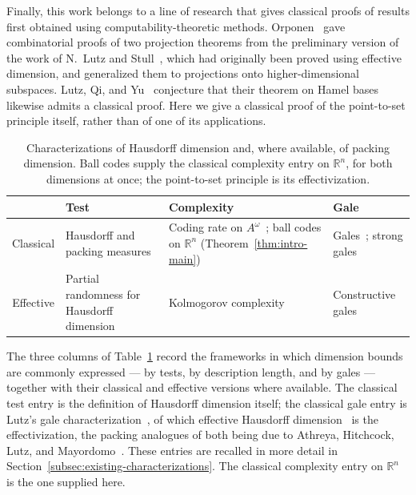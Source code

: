 \documentclass[a4paper,oneside,reqno,12pt]{amsart}
\theoremstyle{plain}
\theoremstyle{definition}
\theoremstyle{remark}
\begin{document}
Finally, this work belongs to a line of research that gives classical proofs of
results first obtained using computability-theoretic methods.
Orponen~\cite{Orponen2021} gave
combinatorial proofs of two projection theorems
from the preliminary version of the work of N.~Lutz and
Stull~\cite{LutzStull2018,LutzStull2024},
which had originally been proved using effective dimension,
and generalized them to projections onto higher-dimensional subspaces.
Lutz, Qi, and Yu~\cite{LutzQiYu2024} conjecture that
their theorem on Hamel bases likewise
admits a classical proof.
Here we give a classical proof of the point-to-set principle itself, rather than
of one of its applications.

\begin{table}[t]
\centering
\begin{tabularx}{\textwidth}{c|X|X|X}
 & Test & Complexity & Gale \\
\hline
Classical
& Hausdorff and packing measures~\cite{Falconer2014}
& Coding rate on \(A^\omega\)~\cite{Ryabko1986};
  ball codes on \(\mathbb R^n\) (Theorem~\ref{thm:intro-main})
& Gales~\cite{Lutz2003};
  strong gales~\cite{AthreyaHitchcockLutzMayordomo2007} \\
Effective
& Partial randomness for Hausdorff dimension~\cite{Tadaki2002}
& Kolmogorov complexity~\cite{Mayordomo2002,%
AthreyaHitchcockLutzMayordomo2007,LutzMayordomo2008}
& Constructive gales~\cite{Lutz2003b,%
AthreyaHitchcockLutzMayordomo2007}
\end{tabularx}
\caption{Characterizations of Hausdorff dimension and, where available, of
packing dimension.  Ball codes supply the classical complexity entry on
\(\mathbb R^n\), for both dimensions at once; the point-to-set principle is its
effectivization.}
\label{tab:test-complexity-gale}
\end{table}

The three columns of Table~\ref{tab:test-complexity-gale} record the frameworks in
which dimension bounds are commonly expressed --- by tests, by description
length, and by gales --- together with their classical and effective versions
where available.
The classical test entry is the definition of Hausdorff dimension
itself; the classical gale entry is Lutz's gale
characterization~\cite[Theorem~3.6]{Lutz2003}, of which effective Hausdorff
dimension~\cite{Lutz2003b} is the effectivization, the packing analogues of both
being due to Athreya, Hitchcock, Lutz, and
Mayordomo~\cite{AthreyaHitchcockLutzMayordomo2007}.  These entries are recalled in more detail in
Section~\ref{subsec:existing-characterizations}.  The classical
complexity entry on \(\mathbb R^n\) is the one supplied here.
\end{document}
